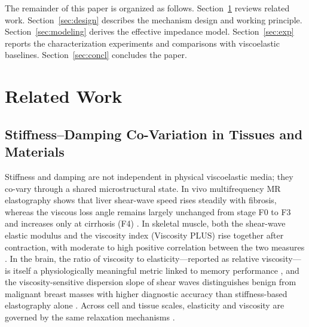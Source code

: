﻿\documentclass[conference]{IEEEtran}
\begin{document}
The remainder of this paper is organized as follows. Section~\ref{sec:related}
reviews related work. Section~\ref{sec:design} describes the mechanism design
and working principle. Section~\ref{sec:modeling} derives the effective
impedance model. Section~\ref{sec:exp} reports the characterization
experiments and comparisons with viscoelastic baselines. Section~\ref{sec:concl}
concludes the paper.

\section{Related Work}\label{sec:related}

\subsection{Stiffness--Damping Co-Variation in Tissues and Materials}
Stiffness and damping are not independent in physical viscoelastic media;
they co-vary through a shared microstructural state. In vivo multifrequency
MR elastography shows that liver shear-wave speed rises steadily with
fibrosis, whereas the viscous loss angle remains largely unchanged from stage
F0 to F3 and increases only at cirrhosis (F4) \cite{reiter2021influence}.
In skeletal muscle, both the shear-wave elastic modulus and the viscosity
index (Viscosity PLUS) rise together after contraction, with moderate to
high positive correlation between the two measures
\cite{dulgheriu2022shear}. In the brain, the ratio of viscosity to
elasticity---reported as relative viscosity---is itself a physiologically
meaningful metric linked to memory performance
\cite{mcilvain2024contributions}, and the viscosity-sensitive dispersion
slope of shear waves distinguishes benign from malignant breast masses with
higher diagnostic accuracy than stiffness-based elastography alone
\cite{woo2026diagnostic}. Across cell and tissue scales, elasticity and
viscosity are governed by the same relaxation mechanisms
\cite{liu2024viscoelasticity}.
\end{document}
